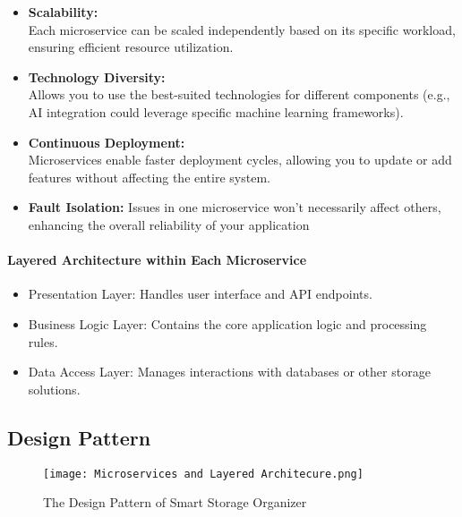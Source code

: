 \documentclass[hidelinks, 12pt, a4paper]{article}
\begin{document}
\begin{itemize}
\begin{itemize}
        \item \textbf{Scalability: }\\
        Each microservice can be scaled independently based on its specific workload, ensuring efficient resource utilization.

        \item \textbf{Technology Diversity: }\\
        Allows you to use the best-suited technologies for different components (e.g., AI integration could leverage specific machine learning frameworks).

        \item \textbf{Continuous Deployment: }\\
        Microservices enable faster deployment cycles, allowing you to update or add features without affecting the entire system.

        \item \textbf{Fault Isolation:}
        Issues in one microservice won’t necessarily affect others, enhancing the overall reliability of your application
    \end{itemize}

    \paragraph{Layered Architecture within Each Microservice}
    \begin{itemize}
        \item Presentation Layer: Handles user interface and API endpoints.
        \item Business Logic Layer: Contains the core application logic and processing rules.
        \item Data Access Layer: Manages interactions with databases or other storage solutions.
    \end{itemize}
    \pagebreak
    \subsection{Design Pattern}
    \begin{figure}[H]
        \centering
        \texttt{[image: Microservices and Layered Architecure.png]}
        \caption{The Design Pattern of Smart Storage Organizer}
        \label{fig:Smart Storage Organizer ClassDiagram}
    \end{figure}


\end{itemize}
\end{document}
